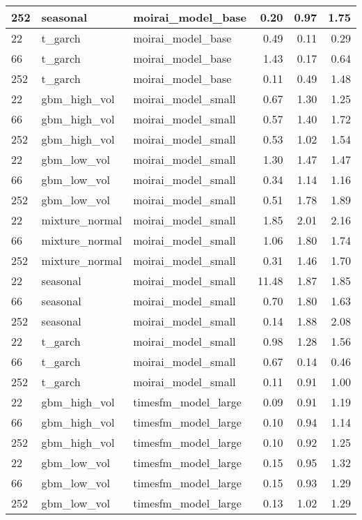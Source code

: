 {\begin{tabular}{lllrrr}
252 & seasonal & moirai\_model\_base & 0.20 & 0.97 & 1.75 \\
\midrule
22 & t\_garch & moirai\_model\_base & 0.49 & 0.11 & 0.29 \\
66 & t\_garch & moirai\_model\_base & 1.43 & 0.17 & 0.64 \\
252 & t\_garch & moirai\_model\_base & 0.11 & 0.49 & 1.48 \\
\midrule
22 & gbm\_high\_vol & moirai\_model\_small & 0.67 & 1.30 & 1.25 \\
66 & gbm\_high\_vol & moirai\_model\_small & 0.57 & 1.40 & 1.72 \\
252 & gbm\_high\_vol & moirai\_model\_small & 0.53 & 1.02 & 1.54 \\
\midrule
22 & gbm\_low\_vol & moirai\_model\_small & 1.30 & 1.47 & 1.47 \\
66 & gbm\_low\_vol & moirai\_model\_small & 0.34 & 1.14 & 1.16 \\
252 & gbm\_low\_vol & moirai\_model\_small & 0.51 & 1.78 & 1.89 \\
\midrule
22 & mixture\_normal & moirai\_model\_small & 1.85 & 2.01 & 2.16 \\
66 & mixture\_normal & moirai\_model\_small & 1.06 & 1.80 & 1.74 \\
252 & mixture\_normal & moirai\_model\_small & 0.31 & 1.46 & 1.70 \\
\midrule
22 & seasonal & moirai\_model\_small & 11.48 & 1.87 & 1.85 \\
66 & seasonal & moirai\_model\_small & 0.70 & 1.80 & 1.63 \\
252 & seasonal & moirai\_model\_small & 0.14 & 1.88 & 2.08 \\
\midrule
22 & t\_garch & moirai\_model\_small & 0.98 & 1.28 & 1.56 \\
66 & t\_garch & moirai\_model\_small & 0.67 & 0.14 & 0.46 \\
252 & t\_garch & moirai\_model\_small & 0.11 & 0.91 & 1.00 \\
\midrule
22 & gbm\_high\_vol & timesfm\_model\_large & 0.09 & 0.91 & 1.19 \\
66 & gbm\_high\_vol & timesfm\_model\_large & 0.10 & 0.94 & 1.14 \\
252 & gbm\_high\_vol & timesfm\_model\_large & 0.10 & 0.92 & 1.25 \\
\midrule
22 & gbm\_low\_vol & timesfm\_model\_large & 0.15 & 0.95 & 1.32 \\
66 & gbm\_low\_vol & timesfm\_model\_large & 0.15 & 0.93 & 1.29 \\
252 & gbm\_low\_vol & timesfm\_model\_large & 0.13 & 1.02 & 1.29 \\

\end{tabular}}
